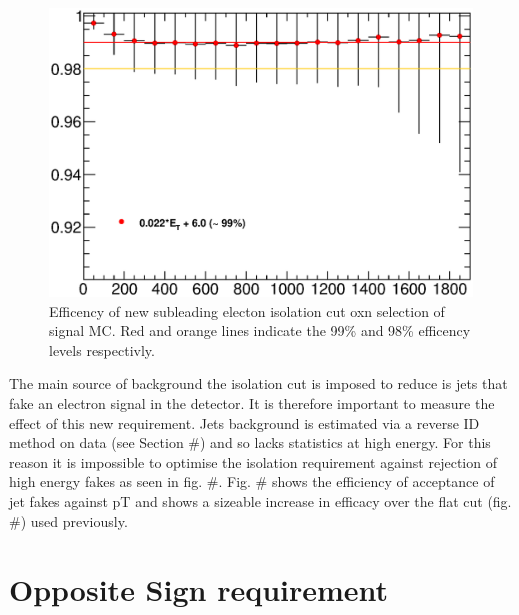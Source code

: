    \begin{figure}[h]
      \begin{center}
      \includegraphics[scale=0.6]{images/C5_sub_iso_efficiency.eps}
      \end{center}
   \caption{Efficency of new subleading electon isolation cut oxn selection of signal MC. Red and orange lines indicate the 99\% and 98\% efficency levels respectivly.}
   \label{fig:C5_sub_iso_efficiency}
   \end{figure}

The main source of background the isolation cut is imposed to reduce is jets that fake an electron signal in the detector. It is therefore important to measure the effect of this new requirement. Jets background is estimated via a reverse ID method on data (see Section \#) and so lacks statistics at high energy. For this reason it is impossible to optimise the isolation requirement against rejection of high energy fakes as seen in fig. \#. Fig. \# shows the efficiency of acceptance of jet fakes against pT and shows a sizeable increase in efficacy over the flat cut (fig. \#) used previously. 



\section{Opposite Sign requirement}

